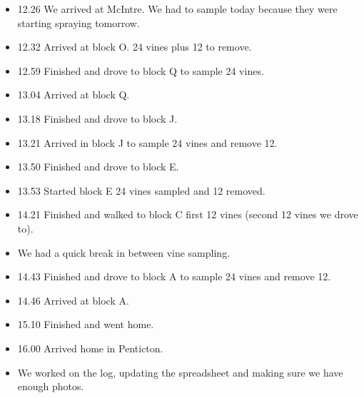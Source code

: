 \documentclass[11pt,letter]{article}
\newenvironment{smitemize}{
\begin{itemize}
  \setlength{\itemsep}{0pt}
  \setlength{\parskip}{0.8pt}
  \setlength{\parsep}{0pt}}
{\end{itemize}
}
\begin{document}
\begin{smitemize}
\item 12.26 We arrived at McIntre. We had to sample today because they were starting spraying tomorrow.
\item 12.32 Arrived at block O. 24 vines plus 12 to remove.
\item 12.59 Finished and drove to block Q to sample 24 vines. 
\item 13.04 Arrived at block Q.
\item 13.18 Finished and drove to block J.
\item 13.21 Arrived in block J to sample 24 vines and remove 12.
\item 13.50 Finished and drove to block E.
\item 13.53 Started block E 24 vines sampled and 12 removed.
\item 14.21 Finished and walked to block C first 12 vines (second 12 vines we drove to).
\item We had a quick break in between vine sampling.
\item 14.43 Finished and drove to block A to sample 24 vines and remove 12.
\item 14.46 Arrived at block A.
\item 15.10 Finished and went home.
\item 16.00 Arrived home in Penticton.
\item We worked on the log, updating the spreadsheet and making sure we have enough photos.  


\end{smitemize}
\end{document}
